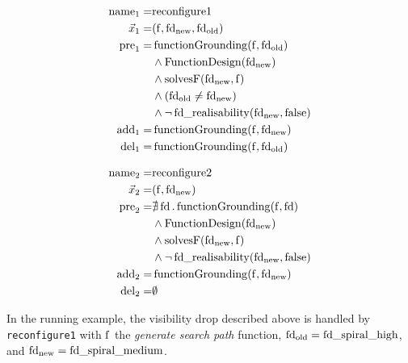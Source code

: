 \vspace{-0.5cm}
\begin{center}
\begin{minipage}[t]{0.5\linewidth}
\begin{align*}
    \operatorname{name}_1 =& \text{reconfigure1} \\
    \vec{x}_1 =& (\operatorname{f}, \operatorname{fd}_\text{new}, \operatorname{fd}_\text{old})\\
    \operatorname{pre}_1 =& \operatorname{functionGrounding}(\operatorname{f}, \operatorname{fd}_\text{old})\\
    & \land \operatorname{FunctionDesign}(\operatorname{fd}_\text{new}) \\
    & \land \operatorname{solvesF}(\operatorname{fd}_\text{new}, \operatorname{f}) \\
    & \land (\operatorname{fd}_\text{old} \neq \operatorname{fd}_\text{new})\\
    & \land \lnot  \operatorname{fd\_realisability}(\operatorname{fd}_\text{new}, \operatorname{false}) \\
    \operatorname{add}_1 =& \operatorname{functionGrounding}(\operatorname{f}, \operatorname{fd}_\text{new}) \\
    \operatorname{del}_1 =& \operatorname{functionGrounding}(\operatorname{f}, \operatorname{fd}_\text{old})
\end{align*}
\end{minipage}%
\begin{minipage}[t]{0.5\linewidth}
\begin{align*}
    \operatorname{name}_2 =& \text{reconfigure2} \\
    \vec{x}_2 =& (\operatorname{f}, \operatorname{fd}_\text{new})\\
    \operatorname{pre}_2 =& \nexists \operatorname{fd}. \operatorname{functionGrounding}(\operatorname{f}, \operatorname{fd}) \\
     &\land \operatorname{FunctionDesign}(\operatorname{fd}_\text{new}) \\
     &\land \operatorname{solvesF}(\operatorname{fd}_\text{new}, \operatorname{f}) \\
     & \land \lnot \operatorname{fd\_realisability}(\operatorname{fd}_\text{new}, \operatorname{false}) \\
    \operatorname{add}_2 =& \operatorname{functionGrounding}(\operatorname{f}, \operatorname{fd}_\text{new}) \\
    \operatorname{del}_2 =& \emptyset
\end{align*}
\end{minipage}
\end{center}

In the running example, the visibility drop described above is handled by \texttt{reconfigure1} with $\operatorname{f}$ the \emph{generate search path} function, $\operatorname{fd}_\text{old} = \operatorname{fd\_spiral\_high}$, and $\operatorname{fd}_\text{new} = \operatorname{fd\_spiral\_medium}$.

